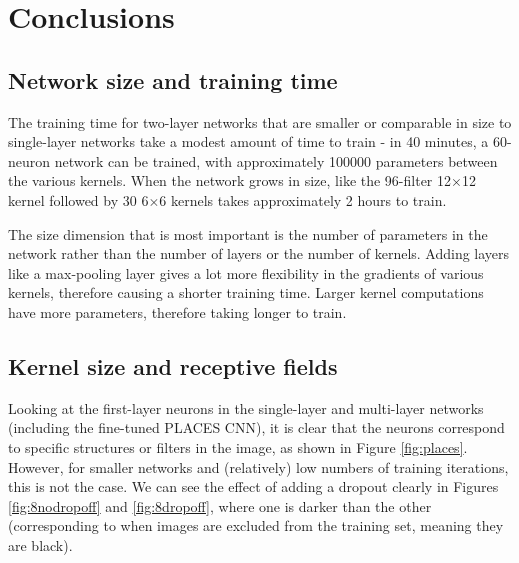 \documentclass[10pt]{article}
\begin{document}
\section{Conclusions}

\subsection{Network size and training time}

The training time for two-layer networks that are smaller or comparable in size to single-layer networks take a modest amount of time to train - in 40 minutes, a 60-neuron network can be trained, with approximately 100000 parameters between the various kernels. When the network grows in size, like the 96-filter 12$\times$12 kernel followed by 30 6$\times$6 kernels takes approximately 2 hours to train. 

The size dimension that is most important is the number of parameters in the network rather than the number of layers or the number of kernels. Adding layers like a max-pooling layer gives a lot more flexibility in the gradients of various kernels, therefore causing a shorter training time. Larger kernel computations have more parameters, therefore taking longer to train. 

\subsection{Kernel size and receptive fields}

Looking at the first-layer neurons in the single-layer and multi-layer networks (including the fine-tuned PLACES CNN), it is clear that the neurons correspond to specific structures or filters in the image, as shown in Figure \ref{fig:places}. However, for smaller networks and (relatively) low numbers of training iterations, this is not the case. We can see the effect of adding a dropout clearly in Figures \ref{fig:8nodropoff} and \ref{fig:8dropoff}, where one is darker than the other (corresponding to when images are excluded from the training set, meaning they are black). 
\end{document}
